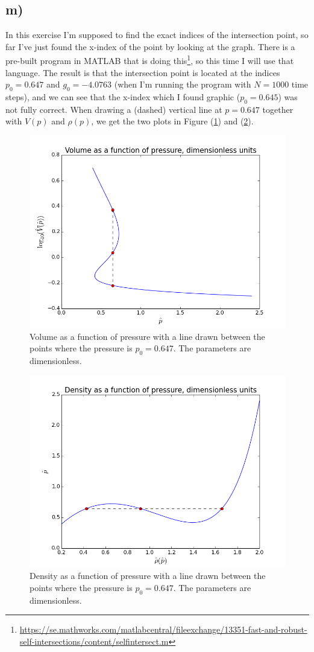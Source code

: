 \documentclass{scrartcl}
\begin{document}
\subsection*{m)}
In this exercise I'm supposed to find the exact indices of the intersection point, so far I've just found the x-index of the point by looking at the graph. There is a pre-built program in MATLAB that is doing this\footnote{\url{https://se.mathworks.com/matlabcentral/fileexchange/13351-fast-and-robust-self-intersections/content/selfintersect.m}}, so this time I will use that language. The result is that the intersection point is located at the indices $p_0=0.647$ and $g_0=-4.0763$ (when I'm running the program with $N=1000$ time steps), and we can see that the x-index which I found graphic ($p_0=0.645$) was not fully correct. When drawing a (dashed) vertical line at $p=0.647$ together with $V(p)$ and $\rho(p)$, we get the two plots in Figure (\ref{fig:m1}) and (\ref{fig:m2}).
\begin{figure}[H]
\centering
\includegraphics[width=120mm]{oblig3_5.png}
\caption{Volume as a function of pressure with a line drawn between the points where the pressure is $p_0=0.647$. The parameters are dimensionless.}
\label{fig:m1}
\end{figure}
\begin{figure}[H]
\centering
\includegraphics[width=120mm]{oblig3_6.png}
\caption{Density as a function of pressure with a line drawn between the points where the pressure is $p_0=0.647$. The parameters are dimensionless.}
\label{fig:m2}
\end{figure}
\end{document}
